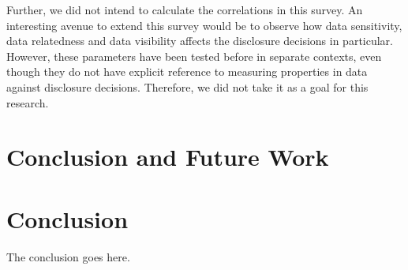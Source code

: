 \documentclass[conference]{IEEEtran}
\begin{document}
Further, we did not intend to calculate the correlations in this survey. An interesting avenue to extend this survey would be to observe how data sensitivity, data relatedness and data visibility affects the disclosure decisions in particular. However, these parameters have been tested before in separate contexts, even though they do not have explicit reference to measuring properties in data against disclosure decisions. Therefore, we did not take it as a goal for this research.



\section{Conclusion and Future Work}

\iffalse 
\footnotesize

\section{Conclusion}
The conclusion goes here. 
\end{document}
